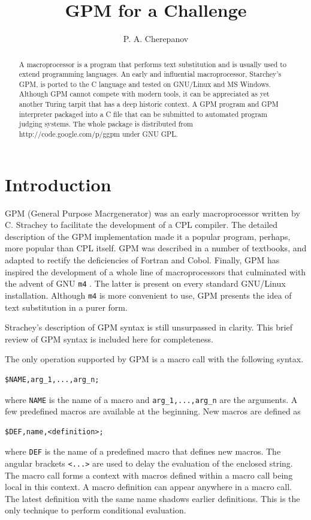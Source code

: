 \documentclass[letterpaper,10pt]{article}
\title{GPM for a Challenge}
\author{P. A. Cherepanov}
\begin{document}
\maketitle

\begin{abstract}
A macroprocessor is a program that performs text substitution
and is usually used to extend programming languages. An early and influential
macroprocessor, Starchey’s GPM, is ported to the
C language and tested on GNU/Linux and MS Windows. 
Although GPM cannot compete with modern tools, it can be appreciated
as yet another Turing tarpit that has a deep historic context.
A GPM program and GPM interpreter packaged into a C file that
can be submitted to automated program judging systems. 
The whole package is distributed from http://code.google.com/p/ggpm
under GNU GPL.
\end{abstract}

\section{Introduction}
GPM (General Purpose Macrgenerator) was an early macroprocessor written
by C. Strachey \cite{strachey} to facilitate the development of a CPL compiler.
The detailed description of the GPM implementation made it a popular
program, perhaps, more popular than CPL itself.
GPM was described in a number of textbooks\cite{mck-intro, comparative},
and adapted to rectify the deficiencies of Fortran\cite{gpmx} and Cobol.
Finally, GPM has inspired the development of a whole line of
macroprocessors that culminated with the advent of GNU \texttt{m4} \cite{gnu-m4}.
The latter is present on every standard GNU/Linux installation.
Although \texttt{m4} is more convenient to use, GPM presents
the idea of text substitution in a purer form.

Strachey's description of GPM syntax \cite{strachey} is still unsurpassed
in clarity. This brief review of GPM syntax is included here for completeness.

The only operation supported by GPM is a macro call with the following syntax.
\begin{verbatim}
$NAME,arg_1,...,arg_n;
\end{verbatim}
where \texttt{NAME} is the name of a macro and \texttt{arg\_1,...,arg\_n}
are the arguments. A few predefined macros are available at the beginning.
New macros are defined as
\begin{verbatim}
$DEF,name,<definition>;
\end{verbatim}
where \texttt{DEF} is the name of a predefined macro that defines new macros.
The angular brackets \texttt{<...>} are used to delay the evaluation
of the enclosed string. 
The macro call forms a context with macros defined within a macro call
being local in this context. A macro definition can appear anywhere
in a macro call. The latest definition with the same name shadows
earlier definitions. This is the only technique to perform conditional 
evaluation.
\end{document}
